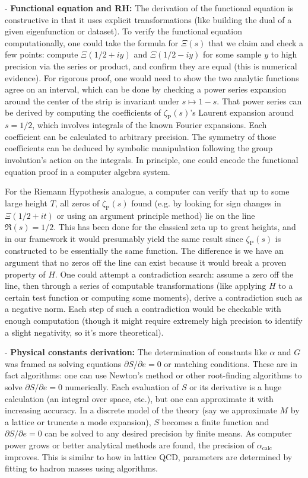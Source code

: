 \documentclass[11pt]{article}
\begin{document}
- \textbf{Functional equation and RH:} The derivation of the functional equation is constructive in that it uses explicit transformations (like building the dual of a given eigenfunction or dataset). To verify the functional equation computationally, one could take the formula for $\Xi(s)$ that we claim and check a few points: compute $\Xi(1/2 + i y)$ and $\Xi(1/2 - i y)$ for some sample $y$ to high precision via the series or product, and confirm they are equal (this is numerical evidence). For rigorous proof, one would need to show the two analytic functions agree on an interval, which can be done by checking a power series expansion around the center of the strip is invariant under $s\mapsto1-s$. That power series can be derived by computing the coefficients of $\zeta_{\mathrm{P}}(s)$'s Laurent expansion around $s=1/2$, which involves integrals of the known Fourier expansions. Each coefficient can be calculated to arbitrary precision. The symmetry of those coefficients can be deduced by symbolic manipulation following the group involution's action on the integrals. In principle, one could encode the functional equation proof in a computer algebra system.

   For the Riemann Hypothesis analogue, a computer can verify that up to some large height $T$, all zeros of $\zeta_{\mathrm{P}}(s)$ found (e.g. by looking for sign changes in $\Xi(1/2+it)$ or using an argument principle method) lie on the line $\Re(s)=1/2$. This has been done for the classical zeta up to great heights, and in our framework it would presumably yield the same result since $\zeta_{\mathrm{P}}(s)$ is constructed to be essentially the same function. The difference is we have an argument that no zeros off the line can exist because it would break a proven property of $H$. One could attempt a contradiction search: assume a zero off the line, then through a series of computable transformations (like applying $H$ to a certain test function or computing some moments), derive a contradiction such as a negative norm. Each step of such a contradiction would be checkable with enough computation (though it might require extremely high precision to identify a slight negativity, so it's more theoretical).

- \textbf{Physical constants derivation:} The determination of constants like $\alpha$ and $G$ was framed as solving equations $\partial S/\partial e = 0$ or matching conditions. These are in fact algorithms: one can use Newton's method or other root-finding algorithms to solve $\partial S/\partial e = 0$ numerically. Each evaluation of $S$ or its derivative is a huge calculation (an integral over space, etc.), but one can approximate it with increasing accuracy. In a discrete model of the theory (say we approximate $M$ by a lattice or truncate a mode expansion), $S$ becomes a finite function and $\partial S/\partial e = 0$ can be solved to any desired precision by finite means. As computer power grows or better analytical methods are found, the precision of $\alpha_{\mathrm{calc}}$ improves. This is similar to how in lattice QCD, parameters are determined by fitting to hadron masses using algorithms.
\end{document}
